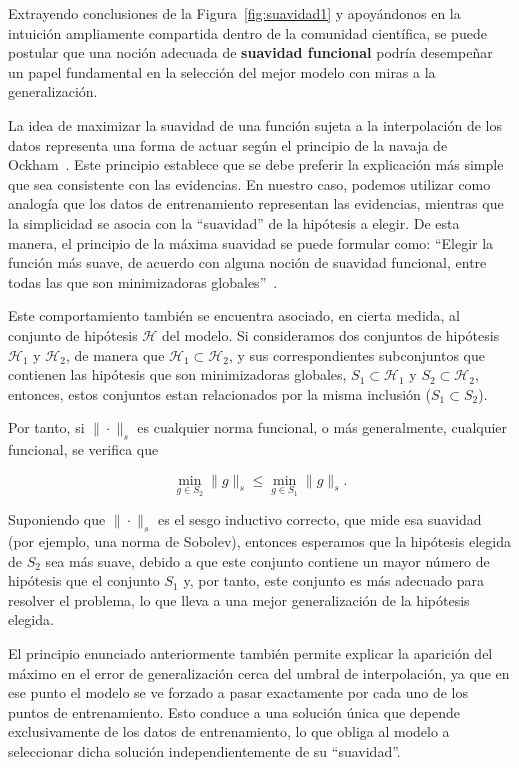 Extrayendo conclusiones de la Figura~\ref{fig:suavidad1} y apoyándonos en la intuición ampliamente compartida dentro de la comunidad científica, se puede postular que una noción adecuada de \textbf{suavidad funcional} podría desempeñar un papel fundamental en la selección del mejor modelo con miras a la generalización.\newline  

La idea de maximizar la suavidad de una función sujeta a la interpolación de los datos representa una forma de actuar según el principio de la navaja de Ockham~\cite{Blumer1987}. Este principio establece que se debe preferir la explicación más simple que sea consistente con las evidencias. En nuestro caso, podemos utilizar como analogía que los datos de entrenamiento representan las evidencias, mientras que la simplicidad se asocia con la ``suavidad'' de la hipótesis a elegir. De esta manera, el principio de la máxima suavidad se puede formular como: ``Elegir la función más suave, de acuerdo con alguna noción de suavidad funcional, entre todas las que son minimizadoras globales''~\cite{Belkin2021}.\newline

Este comportamiento también se encuentra asociado, en cierta medida, al conjunto de hipótesis $\mathcal{H}$ del modelo. Si consideramos dos conjuntos de hipótesis $\mathcal{H}_1$ y $\mathcal{H}_2$, de manera que $\mathcal{H}_1 \subset \mathcal{H}_2$, y sus correspondientes subconjuntos que contienen las hipótesis que son minimizadoras globales, $S_1 \subset \mathcal{H}_1$ y $S_2 \subset \mathcal{H}_2$, entonces, estos conjuntos estan relacionados por la misma inclusión ($S_1 \subset S_2$).\newline

Por tanto, si $\| \cdot \|_{s}$ es cualquier norma funcional, o más generalmente, cualquier funcional, se verifica que

\[
    \min_{g \in S_2} \| g \|_{s} \leq \min_{g \in S_1} \| g \|_{s}.
\]

Suponiendo que $\| \cdot \|_{s}$ es el sesgo inductivo correcto, que mide esa suavidad (por ejemplo, una norma de Sobolev), entonces esperamos que la hipótesis elegida de $S_2$ sea más suave, debido a que este conjunto contiene un mayor número de hipótesis que el conjunto $S_1$ y, por tanto, este conjunto es más adecuado para resolver el problema, lo que lleva a una mejor generalización de la hipótesis elegida.\newline

El principio enunciado anteriormente también permite explicar la aparición del máximo en el error de generalización cerca del umbral de interpolación, ya que en ese punto el modelo se ve forzado a pasar exactamente por cada uno de los puntos de entrenamiento. Esto conduce a una solución única que depende exclusivamente de los datos de entrenamiento, lo que obliga al modelo a seleccionar dicha solución independientemente de su ``suavidad''.\newline

